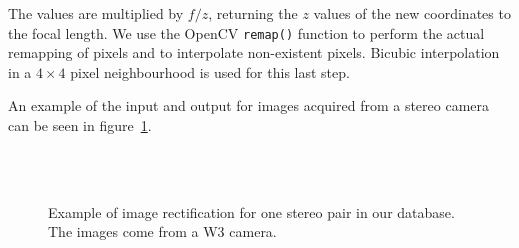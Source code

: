 The values are multiplied by $f/z$, returning the $z$ values of the new coordinates to the focal length. We use the OpenCV \texttt{remap()} function to perform the actual remapping of pixels and to
interpolate non-existent pixels. Bicubic interpolation in a $4\times4$ pixel neighbourhood
is used for this last step.

An example of the input and output for images acquired from a stereo camera can be seen in figure~\ref{fig:ex-rectification}.

\begin{figure}[ht]
 \centering
 \\
 \\
 \caption[Example of image rectification]{Example of image rectification for one stereo pair in our database. The images come from a W3 camera.}
 \label{fig:ex-rectification}
\end{figure}

